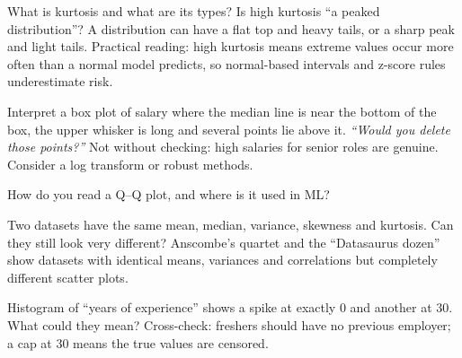 \begin{qa}{What is kurtosis and what are its types? Is high kurtosis ``a peaked distribution''?}
\why A distribution can have a flat top and heavy tails, or a sharp peak and light tails. Practical reading: high kurtosis means extreme values occur more often than a
normal model predicts, so normal-based intervals and z-score rules underestimate risk.
\end{qa}

\begin{qa}{Interpret a box plot of salary where the median line is near the bottom of the box, the upper whisker is long and several points lie above it.}
\pushes \emph{``Would you delete those points?''} Not without checking: high salaries for senior roles are genuine. Consider a log transform or robust methods.
\end{qa}

\begin{qa}{How do you read a Q--Q plot, and where is it used in ML?}
\end{qa}

\begin{qa}{\deep Two datasets have the same mean, median, variance, skewness and kurtosis. Can they still look very different?}
\why Anscombe's quartet and the ``Datasaurus dozen'' show datasets with identical means, variances and correlations but completely different scatter plots.
\end{qa}

\begin{qa}{Histogram of ``years of experience'' shows a spike at exactly 0 and another at 30. What could they mean?}
\why Cross-check: freshers should have no previous employer; a cap at 30 means the true values are censored.
\end{qa}


